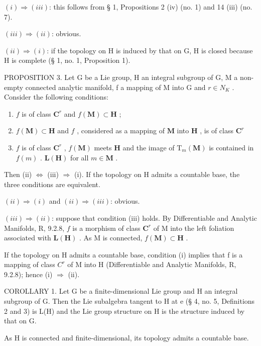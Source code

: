 \((i) \Rightarrow (iii)\): this follows from § 1, Propositions 2 (iv) (no. 1) and 14 (iii) (no. 7).

\((iii) \Rightarrow (ii)\): obvious.

\((ii) \Rightarrow (i)\): if the topology on H is induced by that on G, H is closed because H is complete (§ 1, no. 1, Proposition 1).

PROPOSITION 3. Let G be a Lie group, H an integral subgroup of G, M a non-empty connected analytic manifold, f a mapping of M into G and \(r \in N_{K}\) . Consider the following conditions:

\begin{enumerate}
\def\labelenumi{(\roman{enumi})}
\item
  \(f\) is of class \(\mathbf{C}^r\) and \(f(\mathbf{M})\subset \mathbf{H}\) ;
\item
  \(f(\mathbf{M})\subset \mathbf{H}\) and \(f\) , considered as a mapping of \(\mathbf{M}\) into \(\mathbf{H}\) , is of class \(\mathbf{C}^r\)
\item
  \(f\) is of class \(\mathbf{C}^r\) , \(f(\mathbf{M})\) meets \(\mathbf{H}\) and the image of \(\mathrm{T}_m(\mathbf{M})\) is contained in \(f(m)\) . \(\mathbf{L}(\mathbf{H})\) for all \(m \in \mathbf{M}\) .
\end{enumerate}

Then (ii) \(\Leftrightarrow\) (iii) \(\Rightarrow\) (i). If the topology on H admits a countable base, the three conditions are equivalent.

\((ii) \Rightarrow (i)\) and \((ii) \Rightarrow (iii)\): obvious.

\((iii) \Rightarrow (ii)\): suppose that condition (iii) holds. By Differentiable and Analytic Manifolds, R, 9.2.8, \(f\) is a morphism of class \(\mathbf{C}^r\) of M into the left foliation associated with \(\mathbf{L}(\mathbf{H})\) . As M is connected, \(f(\mathbf{M}) \subset \mathbf{H}\) .

If the topology on H admits a countable base, condition (i) implies that f is a mapping of class \(C^{r}\) of M into H (Differentiable and Analytic Manifolds, R, 9.2.8); hence (i) \(\Rightarrow\) (ii).

COROLLARY 1. Let G be a finite-dimensional Lie group and H an integral subgroup of G. Then the Lie subalgebra tangent to H at e (§ 4, no. 5, Definitions 2 and 3) is L(H) and the Lie group structure on H is the structure induced by that on G.

As H is connected and finite-dimensional, its topology admits a countable base.

